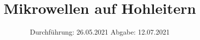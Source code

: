 

\subject{V53}
\title{Mikrowellen auf Hohleitern}
\date{%
  Durchführung: 26.05.2021
  \hspace{3em}
  Abgabe: 12.07.2021
}



\maketitle
\thispagestyle{empty}
\tableofcontents
\newpage








\printbibliography{}



